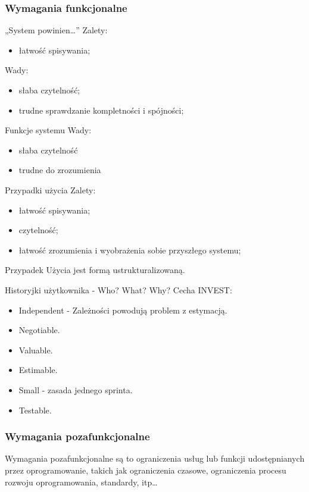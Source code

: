 \documentclass[a4paper]{article}
\begin{document}
\subsubsection{Wymagania funkcjonalne}


„System powinien\dots”
Zalety:
\begin{itemize}
    \item łatwość spisywania;
\end{itemize}
Wady:
\begin{itemize}
    \item słaba czytelność;
    \item trudne sprawdzanie kompletności i spójności;
\end{itemize}

Funkcje systemu
Wady:
\begin{itemize}
\item słaba czytelność
\item trudne do zrozumienia
\end{itemize}

Przypadki użycia
Zalety:
\begin{itemize}
    \item łatwość spisywania;
    \item czytelność;
    \item łatwość zrozumienia i wyobrażenia sobie
przyszłego systemu;
\end{itemize}
Przypadek Użycia jest formą ustrukturalizowaną.

Historyjki użytkownika - Who? What? Why?
Cecha INVEST:
    \begin{itemize}
        \item Independent - Zależności powodują problem z estymacją.
        \item Negotiable.
        \item Valuable.
        \item Estimable.
        \item Small - zasada jednego sprinta.
        \item Testable.
\end{itemize}

\subsubsection{Wymagania pozafunkcjonalne}
Wymagania pozafunkcjonalne są to ograniczenia
usług lub funkcji udostępnianych przez
oprogramowanie, takich jak ograniczenia
czasowe, ograniczenia procesu rozwoju
oprogramowania, standardy, itp\dots
\end{document}
